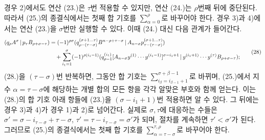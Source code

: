 경우 2)에서도 연산 (23.)은 $\tau$번 적용할 수 있지만, 연산 (24.)는 $\rho$번째 뒤에 중단된다. 따라서 (25.)의 종결식에서는 첫째 합 기호를 $\sum_{\alpha=0}^{\rho}$로 바꾸어야 한다. 경우 3)과 4)에서는 연산 (23.)을 $\sigma$번만 실행할 수 있다. 이때 (24.) 대신 다음 관계가 들어간다.
\begin{equation}
\begin{aligned}
(q_\rho A^\sigma\,|\,p_\tau B_{\rho+\sigma-\tau})
&=(-1)^{\rho\sigma}
 (q_{\rho-(\tau-\sigma)}^{(\sigma+1\ldots\tau)}B^{n-\rho+\tau-\sigma}\,|\,A_{n-\sigma}p_{\tau-(\tau-\sigma)}^{(\sigma+1\ldots\tau)})\\
&\quad+\sum_{i_1=1}^{\sigma}(-1)^{\rho(i_1-1)}
 (q_{\rho-1}^{(i_1)}[A_{n-\sigma}y^{(1)}\cdots y^{(i_1-1)}]^{\sigma-i_1+1}\,|\,y^{(i_1+1)}\cdots y^{(\tau)}B_{\rho+\sigma-\tau});
\end{aligned}
\tag{28}
\end{equation}
(28.)을 $(\tau-\sigma)$번 반복하면, 그동안 합 기호는 $\sum_{i_\beta=i_{\beta-1}+1}^{\sigma+\beta-1}$로 바뀌며, (25.)에서 지수 $\alpha=\tau-\sigma$에 해당하는 개별 합의 모든 항을 각각 알맞은 부호와 함께 얻는다. 이는 (28.)의 합 기호 아래 항들에 (23.)을 $(\sigma-i_1+1)$번 적용하면 알 수 있다. 그 뒤에는 경우 3)과 4)가 경우 1)과 2)로 넘어간다. 실제로 $\sigma,\tau$에 대응하는 수들은 $\sigma'=\sigma-i_{\tau-\sigma}+\tau-\sigma$, $\tau'=\tau-i_{\tau-\sigma}=\sigma'$가 되며, 절차를 계속하면 $\tau'<\sigma'$가 된다. 그러므로 (25.)의 종결식에서는 첫째 합 기호를 $\sum_{\alpha=\tau-\sigma}^{\tau,\rho}$로 바꾸어야 한다.

